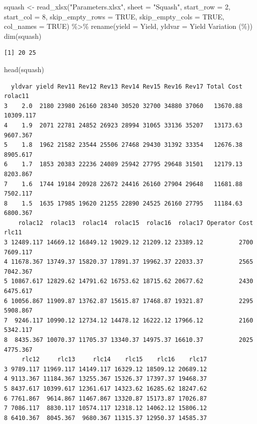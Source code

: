 \documentclass[
  letterpaper,
  DIV=11,
  numbers=noendperiod]{scrartcl}
\newenvironment{Shaded}{\begin{snugshade}}{\end{snugshade}}
\newcommand{\AttributeTok}[1]{\textcolor[rgb]{0.40,0.45,0.13}{#1}}
\newcommand{\ConstantTok}[1]{\textcolor[rgb]{0.56,0.35,0.01}{#1}}
\newcommand{\DecValTok}[1]{\textcolor[rgb]{0.68,0.00,0.00}{#1}}
\newcommand{\FunctionTok}[1]{\textcolor[rgb]{0.28,0.35,0.67}{#1}}
\newcommand{\NormalTok}[1]{\textcolor[rgb]{0.00,0.23,0.31}{#1}}
\newcommand{\OtherTok}[1]{\textcolor[rgb]{0.00,0.23,0.31}{#1}}
\newcommand{\SpecialCharTok}[1]{\textcolor[rgb]{0.37,0.37,0.37}{#1}}
\newcommand{\StringTok}[1]{\textcolor[rgb]{0.13,0.47,0.30}{#1}}
\begin{document}
\begin{Shaded}
\begin{Highlighting}[]
\NormalTok{squash }\OtherTok{\textless{}{-}} \FunctionTok{read\_xlsx}\NormalTok{(}\StringTok{"Parameters.xlsx"}\NormalTok{,}
                    \AttributeTok{sheet =} \StringTok{"Squash"}\NormalTok{,}
                    \AttributeTok{start\_row =} \DecValTok{2}\NormalTok{,}
                    \AttributeTok{start\_col =} \DecValTok{8}\NormalTok{,}
                    \AttributeTok{skip\_empty\_rows =} \ConstantTok{TRUE}\NormalTok{,}
                    \AttributeTok{skip\_empty\_cols =} \ConstantTok{TRUE}\NormalTok{,}
                    \AttributeTok{col\_names =} \ConstantTok{TRUE}\NormalTok{) }\SpecialCharTok{\%\textgreater{}\%} 
  \FunctionTok{rename}\NormalTok{(}\AttributeTok{yield =}\NormalTok{ Yield,}
         \AttributeTok{yldvar =} \StringTok{\textasciigrave{}}\AttributeTok{Yield Variation (\%)}\StringTok{\textasciigrave{}}\NormalTok{)}
\FunctionTok{dim}\NormalTok{(squash)}
\end{Highlighting}
\end{Shaded}

\begin{verbatim}
[1] 20 25
\end{verbatim}

\begin{Shaded}
\begin{Highlighting}[]
\FunctionTok{head}\NormalTok{(squash)}
\end{Highlighting}
\end{Shaded}

\begin{verbatim}
  yldvar yield Rev11 Rev12 Rev13 Rev14 Rev15 Rev16 Rev17 Total Cost   rolac11
3    2.0  2180 23980 26160 28340 30520 32700 34880 37060   13670.88 10309.117
4    1.9  2071 22781 24852 26923 28994 31065 33136 35207   13173.63  9607.367
5    1.8  1962 21582 23544 25506 27468 29430 31392 33354   12676.38  8905.617
6    1.7  1853 20383 22236 24089 25942 27795 29648 31501   12179.13  8203.867
7    1.6  1744 19184 20928 22672 24416 26160 27904 29648   11681.88  7502.117
8    1.5  1635 17985 19620 21255 22890 24525 26160 27795   11184.63  6800.367
    rolac12  rolac13  rolac14  rolac15  rolac16  rolac17 Operator Cost    rlc11
3 12489.117 14669.12 16849.12 19029.12 21209.12 23389.12          2700 7609.117
4 11678.367 13749.37 15820.37 17891.37 19962.37 22033.37          2565 7042.367
5 10867.617 12829.62 14791.62 16753.62 18715.62 20677.62          2430 6475.617
6 10056.867 11909.87 13762.87 15615.87 17468.87 19321.87          2295 5908.867
7  9246.117 10990.12 12734.12 14478.12 16222.12 17966.12          2160 5342.117
8  8435.367 10070.37 11705.37 13340.37 14975.37 16610.37          2025 4775.367
     rlc12     rlc13     rlc14    rlc15    rlc16    rlc17
3 9789.117 11969.117 14149.117 16329.12 18509.12 20689.12
4 9113.367 11184.367 13255.367 15326.37 17397.37 19468.37
5 8437.617 10399.617 12361.617 14323.62 16285.62 18247.62
6 7761.867  9614.867 11467.867 13320.87 15173.87 17026.87
7 7086.117  8830.117 10574.117 12318.12 14062.12 15806.12
8 6410.367  8045.367  9680.367 11315.37 12950.37 14585.37
\end{verbatim}
\end{document}
